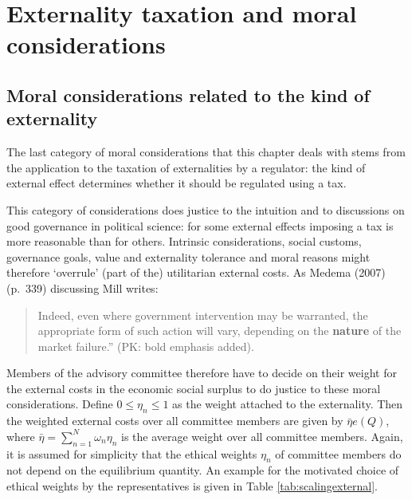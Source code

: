 \documentclass[
]{book}
\begin{document}
\hypertarget{externality-taxation-and-moral-considerations}{%
\section{Externality taxation and moral considerations}\label{externality-taxation-and-moral-considerations}}

\hypertarget{moral-considerations-related-to-the-kind-of-externality}{%
\subsection{Moral considerations related to the kind of externality}\label{moral-considerations-related-to-the-kind-of-externality}}

The last category of moral considerations that this chapter deals with stems from the application to the taxation of externalities by a regulator: the kind of external effect determines whether it should be regulated using a tax.

This category of considerations does justice to the intuition and to discussions on good governance in political science: for some external effects imposing a tax is more reasonable than for others. Intrinsic considerations, social customs, governance goals, value and externality tolerance and moral reasons might therefore `overrule' (part of the) utilitarian external costs. As Medema (2007) (p.~339) discussing Mill writes:

\begin{quote}
Indeed, even where government intervention may be warranted, the appropriate form of such action will vary, depending on the \textbf{nature} of the market failure.'' (PK: bold emphasis added).
\end{quote}

Members of the advisory committee therefore have to decide on their weight for the external costs in the economic social surplus to do justice to these moral considerations. Define \(0 \leq \eta_n \leq 1\) as the weight attached to the externality. Then the weighted external costs over all committee members are given by \(\bar{\eta}e(Q)\), where \(\bar{\eta} = \sum_{n=1}^N \omega_n \eta_n\) is the average weight over all committee members. Again, it is assumed for simplicity that the ethical weights \(\eta_n\) of committee members do not depend on the equilibrium quantity. An example for the motivated choice of ethical weights by the representatives is given in Table \ref{tab:scalingexternal}.
\end{document}
